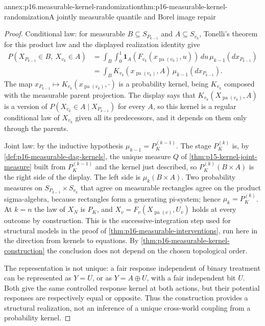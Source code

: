 \begin{annexitem}{annex:p16.measurable-kernel-randomization}{thm:p16-measurable-kernel-randomization}{A jointly measurable quantile and Borel image repair}
\begin{proof}
Conditional law: for measurable \(B\subseteq S_{P_{k-1}}\) and
\(A\subseteq S_{v_k}\), Tonelli's theorem for this product law and the
displayed realization identity give
\[
\begin{aligned}
 P(X_{P_{k-1}}\in B,\ X_{v_k}\in A)
 &=\int_B\int_0^1
     \mathbf 1_A(F_{v_k}(x_{\operatorname{pa}(v_k)},u))\,du\,
     \mu_{k-1}(dx_{P_{k-1}})\\
 &=\int_B K_{v_k}(x_{\operatorname{pa}(v_k)},A)\,
     \mu_{k-1}(dx_{P_{k-1}}).
\end{aligned}
\]
The map \(x_{P_{k-1}}\mapsto K_{v_k}(x_{\operatorname{pa}(v_k)},\cdot)\)
is a probability kernel, being \(K_{v_k}\) composed with the measurable
parent projection. The display says that
\(K_{v_k}(X_{\operatorname{pa}(v_k)},A)\) is a version of
\(P(X_{v_k}\in A\mid X_{P_{k-1}})\) for every \(A\), so this kernel is
a regular conditional law of \(X_{v_k}\) given all its predecessors,
and it depends on them only through the parents.

Joint law: by the inductive hypothesis \(\mu_{k-1}=P_K^{(k-1)}\).
The stage \(P_K^{(k)}\) is, by \cref{def:p16-measurable-dag-kernels},
the unique measure \(Q\) of \cref{thm:p15-kernel-joint-measure} built
from \(P_K^{(k-1)}\) and the kernel just described, so
\(P_K^{(k)}(B\times A)\) is the right side of the display. The left side
is \(\mu_k(B\times A)\). Two probability measures on
\(S_{P_{k-1}}\times S_{v_k}\) that agree on measurable rectangles agree
on the product sigma-algebra, because rectangles form a generating
pi-system; hence \(\mu_k=P_K^{(k)}\). At \(k=n\) the law of
\(X_N\) is \(P_K\), and \(X_v=F_v(X_{\operatorname{pa}(v)},U_v)\) holds
at every outcome by construction. This is the successive-integration
step used for structural models in the proof of
\cref{thm:p16-measurable-interventions}, run here in the direction from
kernels to equations. By \cref{thm:p16-measurable-kernel-construction}
the conclusion does not depend on the chosen topological order.

The representation is not unique: a fair
response independent of binary treatment can be represented as
\(Y=U\), or as \(Y=A\oplus U\), with a fair independent bit \(U\).
Both give the same controlled response kernel at both actions, but
their potential responses are respectively equal or opposite. Thus
the construction provides a structural realization, not an inference
of a unique cross-world coupling from a probability kernel.
\end{proof}
\end{annexitem}

